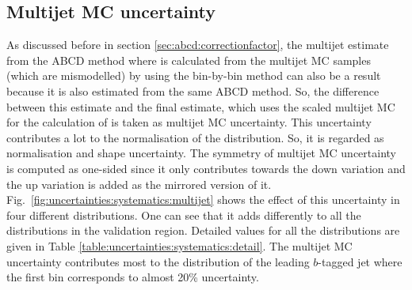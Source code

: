 \subsection{Multijet MC uncertainty}
\label{sec:uncertainties:systematics:multijet}
As discussed before in section \ref{sec:abcd:correctionfactor}, the multijet estimate from the ABCD method where \R is calculated from the multijet MC samples (which are mismodelled) by using the bin-by-bin method can also be a result because it is also estimated from the same ABCD method. So, the difference between this estimate and the final estimate, which uses the scaled multijet MC for the calculation of \R is taken as multijet MC uncertainty. This uncertainty contributes a lot to the normalisation of the distribution. So, it is regarded as normalisation and shape uncertainty. The symmetry of multijet MC uncertainty is computed as one-sided since it only contributes towards the down variation and the up variation is added as the mirrored version of it. Fig.\ \ref{fig:uncertainties:systematics:multijet} shows the effect of this uncertainty in four different distributions. One can see that it adds differently to all the distributions in the validation region. Detailed values for all the distributions are given in Table \ref{table:uncertainties:systematics:detail}. The multijet MC uncertainty contributes most to the \pt distribution of the leading $b$-tagged jet where the first bin corresponds to almost 20\% uncertainty.

